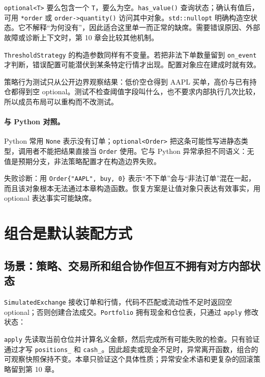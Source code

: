 

\texttt{optional<T>} 要么包含一个 \texttt{T}，要么为空。\texttt{has\_value()} 查询状态；确认有值后，可用 \texttt{*order} 或 \texttt{order->\allowbreak quantity()} 访问其中对象。\texttt{std::nullopt} 明确构造空状态。它不解释“为何没有”，因此适合这里单一而正常的缺席。需要错误原因、外部故障或诊断上下文时，第 10 章会比较其他机制。

\texttt{ThresholdStrategy} 的构造参数同样有不变量。若把非法下单数量留到 \texttt{on\_event} 才判断，错误配置可能潜伏到某条特定行情才出现。配置对象应在建成时就有效。

策略行为测试只从公开边界观察结果：低价空仓得到 AAPL 买单，高价与已有持仓都得到空 optional。测试不检查阈值字段叫什么，也不要求内部执行几次比较，所以成员布局可以重构而不改测试。

\paragraph{与 Python 对照。}
Python 常用 \texttt{None} 表示没有订单；\texttt{optional<Order>} 把这条可能性写进静态类型，调用者不能把结果直接当 \texttt{Order} 使用。它与 Python 异常承担不同语义：无值是预期分支，非法策略配置才在构造边界失败。

失败诊断：用 \texttt{Order\{"AAPL", buy, 0\}} 表示“不下单”会与“非法订单”混在一起，而且该对象根本无法通过本章构造函数。恢复方案是让值对象只表达有效事实，用 optional 表达事实可能缺席。

\section{组合是默认装配方式}

\subsection{场景：策略、交易所和组合协作但互不拥有对方内部状态}

\texttt{SimulatedExchange} 接收订单和行情，代码不匹配或流动性不足时返回空 optional；否则创建合法成交。\texttt{Portfolio} 拥有现金和仓位表，只通过 \texttt{apply} 修改状态：



\texttt{apply} 先读取当前仓位并计算名义金额，然后完成所有可能失败的检查。只有验证通过才写 \texttt{positions\_} 和 \texttt{cash\_}。因此超卖或现金不足时，异常离开函数，组合的可观察快照保持不变。本章只验证这个具体性质；异常安全术语和更复杂的回滚策略留到第 10 章。

